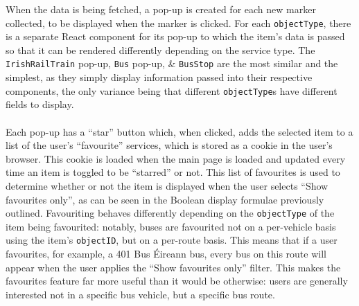 \documentclass[a4paper,11pt]{report}
\begin{document}
When the data is being fetched, a pop-up is created for each new marker collected, to be displayed when the marker is clicked. 
For each \verb|objectType|, there is a separate React component for its pop-up to which the item's data is passed so that it can be rendered differently depending on the service type.
The \verb|IrishRailTrain| pop-up, \verb|Bus| pop-up, \& \verb|BusStop| are the most similar and the simplest, as they simply display information passed into their respective components, the only variance being that different \verb|objectType|s have different fields to display.
\\\\
Each pop-up has a ``star'' button which, when clicked, adds the selected item to a list of the user's ``favourite'' services, which is stored as a cookie in the user's browser.
This cookie is loaded when the main page is loaded and updated every time an item is toggled to be ``starred'' or not.
This list of favourites is used to determine whether or not the item is displayed when the user selects ``Show favourites only'', as can be seen in the Boolean display formulae previously outlined.
Favouriting behaves differently depending on the \verb|objectType| of the item being favourited:
notably, buses are favourited not on a per-vehicle basis using the item's \verb|objectID|, but on a per-route basis.
This means that if a user favourites, for example, a 401 Bus Éireann bus, every bus on this route will appear when the user applies the ``Show favourites only'' filter.
This makes the favourites feature far more useful than it would be otherwise: users are generally interested not in a specific bus vehicle, but a specific bus route.
\end{document}
